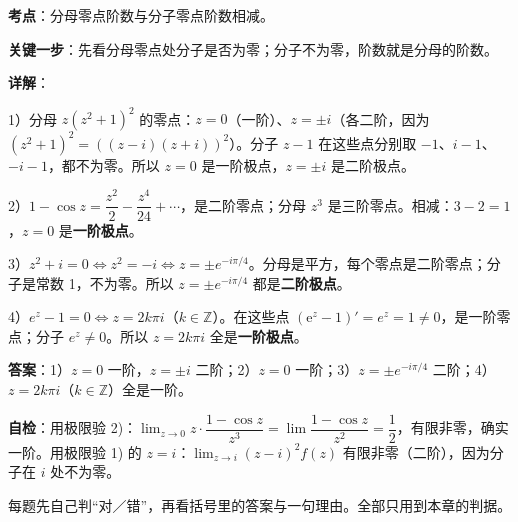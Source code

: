 \documentclass[11pt]{ctexart}
\let\orighdr\hdr
\renewcommand{\hdr}[2]{\par\needspace{9\baselineskip}\orighdr{#1}{#2}}
\begin{document}
\textbf{考点}：分母零点阶数与分子零点阶数相减。

\textbf{关键一步}：先看分母零点处分子是否为零；分子不为零，阶数就是分母的阶数。

\textbf{详解}：

1）分母 $z(z^2+1)^2$ 的零点：$z=0$（一阶）、$z=\pm i$（各二阶，因为 $(z^2+1)^2=((z-i)(z+i))^2$）。分子 $z-1$ 在这些点分别取 $-1$、$i-1$、$-i-1$，都不为零。所以 $z=0$ 是一阶极点，$z=\pm i$ 是二阶极点。

2）$1-\cos z=\dfrac{z^2}{2}-\dfrac{z^4}{24}+\cdots$，是二阶零点；分母 $z^3$ 是三阶零点。相减：$3-2=1$，$z=0$ 是\textbf{一阶极点}。

3）$z^2+i=0\iff z^2=-i\iff z=\pm e^{-i\pi/4}$。分母是平方，每个零点是二阶零点；分子是常数 1，不为零。所以 $z=\pm e^{-i\pi/4}$ 都是\textbf{二阶极点}。

4）$e^z-1=0\iff z=2k\pi i$（$k\in\mathbb{Z}$）。在这些点 $(\mathrm{e}^{z}-1)'=e^z=1\ne0$，是一阶零点；分子 $e^z\ne0$。所以 $z=2k\pi i$ 全是\textbf{一阶极点}。

\textbf{答案}：1）$z=0$ 一阶，$z=\pm i$ 二阶；2）$z=0$ 一阶；3）$z=\pm e^{-i\pi/4}$ 二阶；4）$z=2k\pi i$（$k\in\mathbb{Z}$）全是一阶。

\textbf{自检}：用极限验 2)：$\lim_{z\to0}z\cdot\dfrac{1-\cos z}{z^3}=\lim\dfrac{1-\cos z}{z^2}=\dfrac12$，有限非零，确实一阶。用极限验 1) 的 $z=i$：$\lim_{z\to i}(z-i)^2f(z)$ 有限非零（二阶），因为分子在 $i$ 处不为零。

\flowerrule


每题先自己判“对／错”，再看括号里的答案与一句理由。全部只用到本章的判据。
\end{document}
